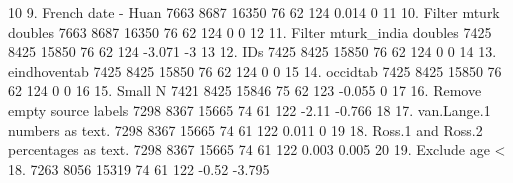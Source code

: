 \documentclass[]{article}
\newenvironment{Shaded}{\begin{snugshade}}{\end{snugshade}}
\newcommand{\DecValTok}[1]{\textcolor[rgb]{0.86,0.86,0.80}{{#1}}}
\newcommand{\FloatTok}[1]{\textcolor[rgb]{0.75,0.75,0.82}{{#1}}}
\newcommand{\StringTok}[1]{\textcolor[rgb]{0.80,0.58,0.58}{{#1}}}
\newcommand{\NormalTok}[1]{\textcolor[rgb]{0.80,0.80,0.80}{{#1}}}
\begin{document}
\begin{Shaded}
\begin{Highlighting}[]
\DecValTok{10}                      \DecValTok{9}\NormalTok{. French date -}\StringTok{ }\NormalTok{Huan }\DecValTok{7663} \DecValTok{8687} \DecValTok{16350}      \DecValTok{76}      \DecValTok{62}      \DecValTok{124}    \FloatTok{0.014}        \DecValTok{0}
\DecValTok{11}                   \DecValTok{10}\NormalTok{. Filter mturk doubles }\DecValTok{7663} \DecValTok{8687} \DecValTok{16350}      \DecValTok{76}      \DecValTok{62}      \DecValTok{124}        \DecValTok{0}        \DecValTok{0}
\DecValTok{12}             \DecValTok{11}\NormalTok{. Filter mturk_india doubles }\DecValTok{7425} \DecValTok{8425} \DecValTok{15850}      \DecValTok{76}      \DecValTok{62}      \DecValTok{124}   \NormalTok{-}\FloatTok{3.071}       \NormalTok{-}\DecValTok{3}
\DecValTok{13}                                    \DecValTok{12}\NormalTok{. IDs }\DecValTok{7425} \DecValTok{8425} \DecValTok{15850}      \DecValTok{76}      \DecValTok{62}      \DecValTok{124}        \DecValTok{0}        \DecValTok{0}
\DecValTok{14}                           \DecValTok{13}\NormalTok{. eindhoventab }\DecValTok{7425} \DecValTok{8425} \DecValTok{15850}      \DecValTok{76}      \DecValTok{62}      \DecValTok{124}        \DecValTok{0}        \DecValTok{0}
\DecValTok{15}                               \DecValTok{14}\NormalTok{. occidtab }\DecValTok{7425} \DecValTok{8425} \DecValTok{15850}      \DecValTok{76}      \DecValTok{62}      \DecValTok{124}        \DecValTok{0}        \DecValTok{0}
\DecValTok{16}                                \DecValTok{15}\NormalTok{. Small N }\DecValTok{7421} \DecValTok{8425} \DecValTok{15846}      \DecValTok{75}      \DecValTok{62}      \DecValTok{123}   \NormalTok{-}\FloatTok{0.055}        \DecValTok{0}
\DecValTok{17}             \DecValTok{16}\NormalTok{. Remove empty source labels }\DecValTok{7298} \DecValTok{8367} \DecValTok{15665}      \DecValTok{74}      \DecValTok{61}      \DecValTok{122}    \NormalTok{-}\FloatTok{2.11}   \NormalTok{-}\FloatTok{0.766}
\DecValTok{18}           \DecValTok{17}\NormalTok{. van.Lange}\FloatTok{.1} \NormalTok{numbers as text. }\DecValTok{7298} \DecValTok{8367} \DecValTok{15665}      \DecValTok{74}      \DecValTok{61}      \DecValTok{122}    \FloatTok{0.011}        \DecValTok{0}
\DecValTok{19} \DecValTok{18}\NormalTok{. Ross}\FloatTok{.1} \NormalTok{and Ross}\FloatTok{.2} \NormalTok{percentages as text. }\DecValTok{7298} \DecValTok{8367} \DecValTok{15665}      \DecValTok{74}      \DecValTok{61}      \DecValTok{122}    \FloatTok{0.003}    \FloatTok{0.005}
\DecValTok{20}                      \DecValTok{19}\NormalTok{. Exclude age <}\StringTok{ }\DecValTok{18}\NormalTok{. }\DecValTok{7263} \DecValTok{8056} \DecValTok{15319}      \DecValTok{74}      \DecValTok{61}      \DecValTok{122}    \NormalTok{-}\FloatTok{0.52}   \NormalTok{-}\FloatTok{3.795}
\end{Highlighting}
\end{Shaded}
\end{document}
